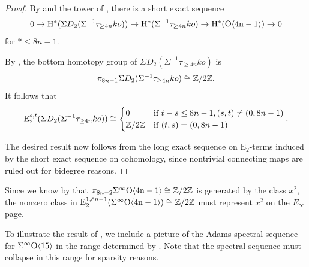 \begin{proof}
  By  and the tower of , there is a short exact sequence
  \[ 0 \to \mathrm{H}^* (\Sigma D_2 (\Sigma^{-1} \tau_{\geq 4n} ko)) \to \mathrm{H}^* (\Sigma^{-1} \tau_{\geq 4n} ko) \to \mathrm{H}^* (\mathrm{O}\mathrm{\langle 4n-1 \rangle)} \to 0 \]
  for $* \leq 8n-1.$

  By , the bottom homotopy group of $\Sigma D_2 (\Sigma^{-1} \tau_{\geq 4n} ko)$ is \[\pi_{8n-1} \Sigma D_2 (\Sigma^{-1} \tau_{\geq 4n} ko) \cong \mathbb{Z}/2\mathbb{Z}.\] It follows that \[\mathrm{E}_2 ^{s,t} (\Sigma D_2 (\Sigma^{-1} \tau_{\geq 4n} ko)) \cong \begin{cases} 0 & \text{if } t-s \leq 8n-1, (s,t) \neq (0,8n-1) \\ \mathbb{Z}/2\mathbb{Z} & \text{if } (t,s) = (0,8n-1) \end{cases}.\]

  The desired result now follows from the long exact sequence on $\mathrm{E}_2$-terms induced by the short exact sequence on cohomology, since nontrivial connecting maps are ruled out for bidegree reasons.
\end{proof}

\begin{rmk}\label{rmk:x2-filt}
  Since we know by  that $\pi_{8n-2} \Sigma^{\infty} \mathrm{O}\mathrm{\langle 4n-1 \rangle} \cong \mathbb{Z}/2\mathbb{Z}$ is generated by the class $x^2$, the nonzero class in $\mathrm{E}_2 ^{1,8n-1} (\Sigma^{\infty} \mathrm{O}\mathrm{\langle 4n-1 \rangle}) \cong \mathbb{Z}/2\mathbb{Z}$ must represent $x^2$ on the $E_\infty$ page.
\end{rmk}

To illustrate the result of , we include a picture of the Adams spectral sequence for $\Sigma^{\infty} \mathrm{O} \mathrm{\langle 15 \rangle}$ in the range determined by . Note that the spectral sequence must collapse in this range for sparsity reasons.

